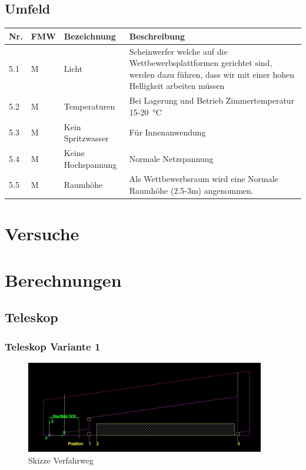 \documentclass[a4paper]{report}
\begin{document}
\section{Umfeld}
\label{app:sec:Umfeld}
\begin{tabular}{|p{}|p{}|p{}|p{}|}
	\hline
	\textbf{Nr.} & \textbf{FMW\footnotemark} & \textbf{Bezeichnung} & \textbf{Beschreibung} \\
	\hline
	5.1 & M & Licht & Scheinwerfer welche auf die Wettbewerbsplattformen gerichtet sind, werden dazu führen, dass wir mit einer hohen Helligkeit arbeiten müssen \\
	\hline
	5.2 & M & Temperaturen & Bei Lagerung und Betrieb Zimmertemperatur 15-\SI{20}{\degreeCelsius}\\
	\hline
	5.3 & M & Kein Spritzwasser & Für Innenanwendung\\
	\hline
	5.4 & M & Keine Hochspannung & Normale Netzspannung\\
	\hline
	5.5 & M & Raumhöhe & Als Wettbewerbsraum wird eine Normale Raumhöhe (2.5-3m) angenommen.\\
	\hline
\end{tabular}

\chapter{Versuche}
\label{app:ch:Versuche}

\chapter{Berechnungen}
\label{app:ch:Berechnung}
\section{Teleskop}
\label{app:sec:Teleskjope}
\subsection{Teleskop Variante 1}
\label{app:ssec:TeleskopjeVar1}
\begin{figure}[h]
	\centering
	\includegraphics[keepaspectratio,height=4cm]{Teleskoparm1.JPG}
	\caption{Skizze Verfahrweg}
	\label{fig:Skizze Verfahrweg}
\end{figure}
\end{document}
